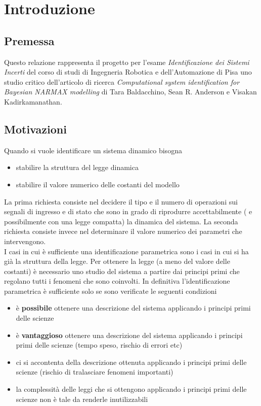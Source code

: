 \documentclass[10pt,a4paper,oneside,openany,noindent]{report}
\begin{document}
\hspace{1em}
\newpage

\chapter{Introduzione}
\section*{Premessa}

Questo relazione rappresenta il progetto per l'esame \emph{Identificazione dei Sistemi Incerti} del corso di studi di Ingegneria Robotica e dell'Automazione di Pisa uno studio critico dell'articolo di ricerca \textit{Computational system identification for Bayesian
NARMAX modelling} di Tara Baldacchino, Sean R. Anderson  e Visakan Kadirkamanathan.
\section*{Motivazioni}
Quando si vuole identificare un sistema dinamico bisogna
\begin{itemize}
\item stabilire la struttura del legge dinamica
\item stabilire il valore numerico delle costanti del modello
\end{itemize}
La prima richiesta consiste nel decidere il tipo e il numero di operazioni sui segnali di ingresso e di stato che sono in grado di riprodurre accettabilmente ( e possibilmente con una legge compatta) la dinamica del sistema.
La seconda richiesta consiste invece nel determinare il valore numerico dei parametri che intervengono.\\


I casi in cui è sufficiente una identificazione parametrica sono i casi in cui si ha già la struttura della legge. Per ottenere la legge (a meno del valore delle costanti) è necessario uno studio del sistema a partire dai principi primi che regolano tutti i fenomeni che sono coinvolti. In definitiva l'identificazione parametrica è sufficiente solo se sono verificate le seguenti condizioni
\begin{itemize}
\item è \textbf{possibile} ottenere una descrizione del sistema applicando i principi primi delle scienze
\item è \textbf{vantaggioso} ottenere una descrizione del sistema applicando i principi primi delle scienze (tempo speso, rischio di errori etc)
\item ci si accontenta della descrizione ottenuta applicando i principi primi delle scienze (rischio di tralasciare fenomeni importanti)
\item la complessità delle leggi che si ottengono applicando i principi primi delle scienze non è tale da renderle inutilizzabili
\end{itemize}
\end{document}
